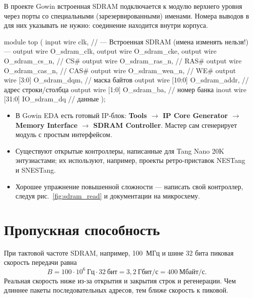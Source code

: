 В проекте Gowin встроенная SDRAM подключается к модулю верхнего уровня через
порты со специальными (зарезервированными) именами. Номера выводов в
 для них указывать не нужно: соединение находится внутри корпуса.

\begin{vcode}
module top (
    input  wire        clk,
    // --- Встроенная SDRAM (имена изменять нельзя!) ---
    output wire        O_sdram_clk,
    output wire        O_sdram_cke,
    output wire        O_sdram_cs_n,    // CS#
    output wire        O_sdram_ras_n,   // RAS#
    output wire        O_sdram_cas_n,   // CAS#
    output wire        O_sdram_wen_n,   // WE#
    output wire [3:0]  O_sdram_dqm,     // маска байтов
    output wire [10:0] O_sdram_addr,    // адрес строки/столбца
    output wire [1:0]  O_sdram_ba,      // номер банка
    inout  wire [31:0] IO_sdram_dq      // данные
);
\end{vcode}

\begin{infobox}
\begin{itemize}
  \item В Gowin EDA есть готовый IP-блок: \textbf{Tools $\to$ IP Core Generator
        $\to$ Memory Interface $\to$ SDRAM Controller}. Мастер сам
        сгенерирует модуль с простым интерфейсом.
  \item Существуют открытые контроллеры, написанные для Tang Nano 20K
        энтузиастами; их используют, например, проекты ретро-приставок NESTang и
        SNESTang.
  \item Хорошее упражнение повышенной сложности --- написать свой контроллер,
        следуя рис.~\ref{fig:sdram_read} и документации на микросхему.
\end{itemize}
\end{infobox}

\section{Пропускная способность}

При тактовой частоте SDRAM, например, 100~МГц и шине 32 бита пиковая
скорость передачи равна
\[
  B = 100 \cdot 10^6 \ \text{Гц} \cdot 32 \ \text{бит} = 3{,}2 \ \text{Гбит/с} = 400 \ \text{Мбайт/с}.
\]
Реальная скорость ниже из-за открытия и закрытия строк и регенерации.
Чем длиннее пакеты последовательных адресов, тем ближе скорость к пиковой.

